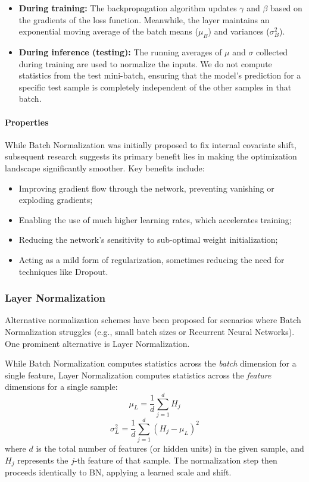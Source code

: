 \begin{itemize}
    \item \textbf{During training:} The backpropagation algorithm updates $\gamma$ and $\beta$ based on the gradients of the loss function. Meanwhile, the layer maintains an exponential moving average of the batch means ($\mu_B$) and variances ($\sigma_B^2$).
    \item \textbf{During inference (testing):} The running averages of $\mu$ and $\sigma$ collected during training are used to normalize the inputs. We do not compute statistics from the test mini-batch, ensuring that the model's prediction for a specific test sample is completely independent of the other samples in that batch.
\end{itemize}

\paragraph{Properties}
While Batch Normalization was initially proposed to fix internal covariate shift, subsequent research suggests its primary benefit lies in making the optimization landscape significantly smoother. Key benefits include:
\begin{itemize}
    \item Improving gradient flow through the network, preventing vanishing or exploding gradients;
    \item Enabling the use of much higher learning rates, which accelerates training;
    \item Reducing the network's sensitivity to sub-optimal weight initialization;
    \item Acting as a mild form of regularization, sometimes reducing the need for techniques like Dropout.
\end{itemize}

\subsubsection{Layer Normalization}
Alternative normalization schemes have been proposed for scenarios where Batch Normalization struggles (e.g., small batch sizes or Recurrent Neural Networks). One prominent alternative is Layer Normalization.

While Batch Normalization computes statistics across the \textit{batch} dimension for a single feature, Layer Normalization computes statistics across the \textit{feature} dimensions for a single sample:
\begin{equation*}
    \mu_L = \frac{1}{d} \sum_{j=1}^{d} H_j
\end{equation*}
\begin{equation*}
    \sigma_L^2 = \frac{1}{d} \sum_{j=1}^{d} (H_j - \mu_L)^2
\end{equation*}
where $d$ is the total number of features (or hidden units) in the given sample, and $H_j$ represents the $j$-th feature of that sample. The normalization step then proceeds identically to BN, applying a learned scale and shift.

